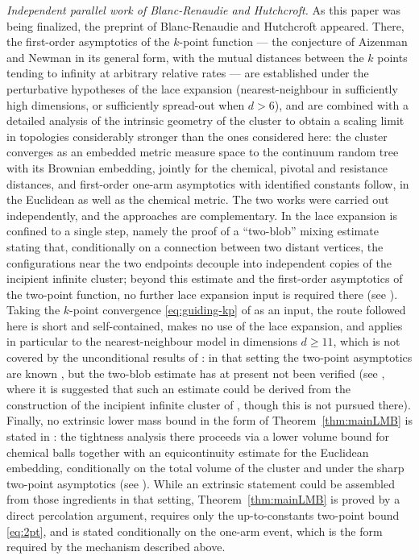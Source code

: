 \documentclass[11pt]{article}
\theoremstyle{definition}
\theoremstyle{remark}
\numberwithin{equation}{section}
\theoremstyle{plain}
\theoremstyle{definition}
\theoremstyle{remark}
\theoremstyle{plain}
\begin{document}
\emph{Independent parallel work of Blanc-Renaudie and Hutchcroft.} As this paper was being finalized, the preprint of Blanc-Renaudie and Hutchcroft \cite{BRH26} appeared. There, the first-order asymptotics of the $k$-point function --- the conjecture of Aizenman and Newman \cite{AN84} in its general form, with the mutual distances between the $k$ points tending to infinity at arbitrary relative rates --- are established under the perturbative hypotheses of the lace expansion (nearest-neighbour in sufficiently high dimensions, or sufficiently spread-out when $d>6$), and are combined with a detailed analysis of the intrinsic geometry of the cluster to obtain a scaling limit in topologies considerably stronger than the ones considered here: the cluster converges as an embedded metric measure space to the continuum random tree with its Brownian embedding, jointly for the chemical, pivotal and resistance distances, and first-order one-arm asymptotics with identified constants follow, in the Euclidean as well as the chemical metric. The two works were carried out independently, and the approaches are complementary. In \cite{BRH26} the lace expansion is confined to a single step, namely the proof of a ``two-blob'' mixing estimate stating that, conditionally on a connection between two distant vertices, the configurations near the two endpoints decouple into independent copies of the incipient infinite cluster; beyond this estimate and the first-order asymptotics of the two-point function, no further lace expansion input is required there (see \cite[Theorems~1.11 and~1.12]{BRH26}). Taking the $k$-point convergence \eqref{eq:guiding-kp} of \cite{CCHS26} as an input, the route followed here is short and self-contained, makes no use of the lace expansion, and applies in particular to the nearest-neighbour model in dimensions $d\ge11$, which is not covered by the unconditional results of \cite{BRH26}: in that setting the two-point asymptotics are known \cite{FH17}, but the two-blob estimate has at present not been verified (see \cite[Remark~1.3]{BRH26}, where it is suggested that such an estimate could be derived from the construction of the incipient infinite cluster of \cite{CCHSiic}, though this is not pursued there). Finally, no extrinsic lower mass bound in the form of Theorem~\ref{thm:mainLMB} is stated in \cite{BRH26}: the tightness analysis there proceeds via a lower volume bound for chemical balls together with an equicontinuity estimate for the Euclidean embedding, conditionally on the total volume of the cluster and under the sharp two-point asymptotics (see \cite[Lemmas~6.5 and~6.6]{BRH26}). While an extrinsic statement could be assembled from those ingredients in that setting, Theorem~\ref{thm:mainLMB} is proved by a direct percolation argument, requires only the up-to-constants two-point bound \eqref{eq:2pt}, and is stated conditionally on the one-arm event, which is the form required by the mechanism described above.
\end{document}
